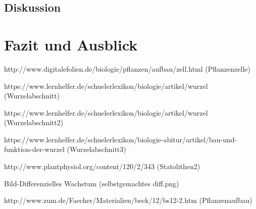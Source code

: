 \documentclass[
a4paper, 
11pt, 
ngerman,
listof=totoc,
bibliography=totocnumbered,
abstracton
]{scrreprt}
\begin{document}
\section{Diskussion}

\chapter{Fazit und Ausblick}


\printbibliography

% 
% 
%


http://www.digitalefolien.de/biologie/pflanzen/aufbau/zell.html (Pflanzenzelle)

https://www.lernhelfer.de/schuelerlexikon/biologie/artikel/wurzel (Wurzelabschnitt)

https://www.lernhelfer.de/schuelerlexikon/biologie/artikel/wurzel (Wurzelabschnitt2)

https://www.lernhelfer.de/schuelerlexikon/biologie-abitur/artikel/bau-und-funktion-der-wurzel (Wurzelabschnitt3)

http://www.plantphysiol.org/content/120/2/343 (Statolithen2)

Bild-Differenzielles Wachstum (selbstgemachtes diff.png)

http://www.zum.de/Faecher/Materialien/beck/12/bs12-2.htm (Pflanzenaufbau)
\end{document}
